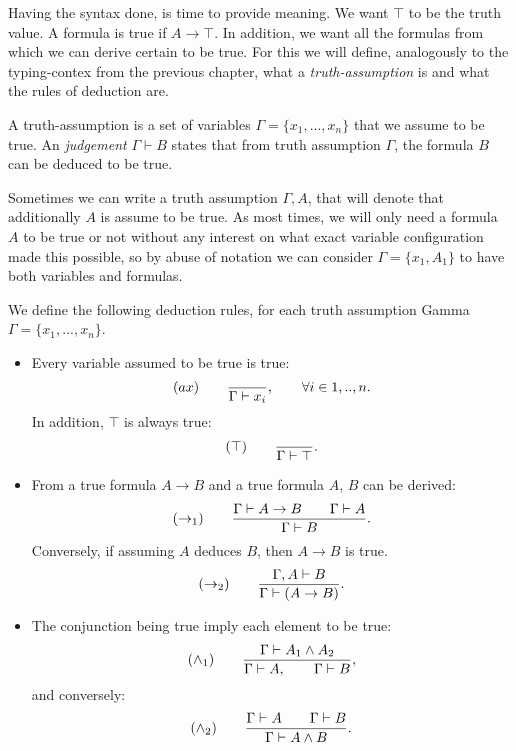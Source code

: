 Having the syntax done, is time to provide meaning. We want $\top$ to be the truth value. A formula is true if $A \to \top$. In addition, we want all the formulas from which we can derive certain to be true. For this we will define, analogously to the typing-contex from the previous chapter, what a \emph{truth-assumption} is and  what the rules of deduction are.

\begin{definition}
 A truth-assumption is a set of variables $\Gamma = \{x_1,...,x_n\}$ that we assume to be true. An \emph{judgement} $\Gamma \vdash B$ states that from truth assumption $\Gamma$, the formula $B$ can be deduced to be true. 
\end{definition}

Sometimes we can write a truth assumption $\Gamma, A$, that will denote that additionally $A$ is assume to be true. As most times, we will only need a formula $A$ to be true or not without any interest on what exact variable configuration made this possible, so by abuse of notation we can consider $\Gamma = \{x_1,A_1\}$ to have both variables and formulas.  
\begin{definition}
  We define the following deduction rules, for each truth assumption Gamma $\Gamma=\{x_1,...,x_n\}$.
  \begin{itemize}
    \item Every variable assumed to be true is true:
      $$  (ax)\qquad  {\displaystyle \over \Gamma \vdash x_i},\qquad \forall i \in 1,..,n.$$
      In addition, $\top$ is always true:
      $$  (\top)\qquad  {\displaystyle \over \Gamma \vdash \top}.$$
\item From a true formula $A\to B$ and a true formula $A$, $B$ can be derived:
  $$(\to_1)\qquad  {\displaystyle \Gamma \vdash A\to B\qquad \Gamma \vdash A      \over \Gamma \vdash B}.$$
  Conversely, if assuming $A$ deduces $B$, then $A\to B$ is true.
$$(\to_2)\qquad  {\displaystyle \Gamma, A \vdash B      \over \Gamma \vdash (A\to B)}.$$
  
\item The conjunction being true imply each element to be true:
  $$(\land_1) \qquad {\displaystyle \Gamma\vdash A_1\land A_2 \over \Gamma \vdash A, \qquad \Gamma \vdash B },$$
and conversely:
  $$(\land_2) \qquad {\displaystyle \Gamma\vdash A\qquad \Gamma\vdash B \over \Gamma \vdash  A \land B}.$$
  \end{itemize}
\end{definition}




